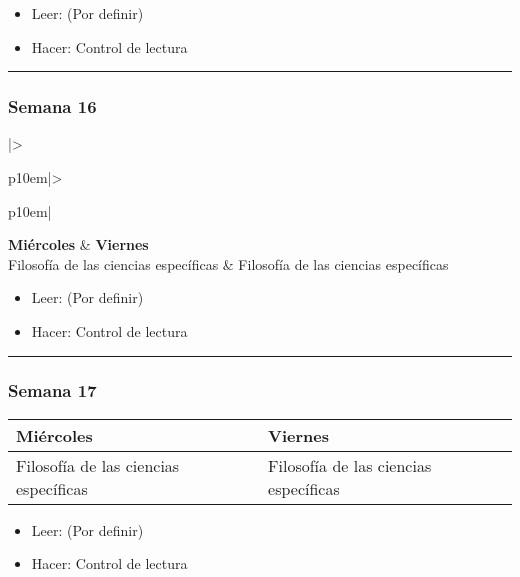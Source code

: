 \documentclass[spanish,]{article}
\begin{document}
\begin{itemize}
\item
  Leer: (Por definir)
\item
  Hacer: Control de lectura
\end{itemize}

\begin{center}\rule{0.5\linewidth}{\linethickness}\end{center}

\subsubsection{Semana 16}\label{semana-16}

\begin{tabular}{|>{\raggedright\arraybackslash}p{10em}|>{\raggedright\arraybackslash}p{10em}|}
\hline
\textbf{Miércoles} & \textbf{Viernes}\\
\hline
Filosofía de las ciencias específicas & Filosofía de las ciencias específicas\\
\hline
\end{tabular}

\begin{itemize}
\item
  Leer: (Por definir)
\item
  Hacer: Control de lectura
\end{itemize}

\begin{center}\rule{0.5\linewidth}{\linethickness}\end{center}

\subsubsection{Semana 17}\label{semana-17}

\begin{tabular}{|>{\raggedright\arraybackslash}p{10em}|>{\raggedright\arraybackslash}p{10em}|}
\hline
\textbf{Miércoles} & \textbf{Viernes}\\
\hline
Filosofía de las ciencias específicas & Filosofía de las ciencias específicas\\
\hline
\end{tabular}

\begin{itemize}
\item
  Leer: (Por definir)
\item
  Hacer: Control de lectura
\end{itemize}
\end{document}

